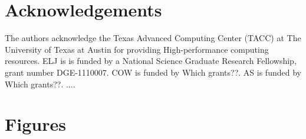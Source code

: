 \documentclass[12pt]{article}
\begin{document}
\section{Acknowledgements}
The authors acknowledge the Texas Advanced Computing Center (TACC) at The University of Texas at Austin for providing High-performance computing resources. ELJ is is funded by a National Science Graduate Research Fellowship, grant number DGE-1110007. COW is funded by {\color{red} Which grants??}.  AS is funded by {\color{red} Which grants??}.
....




\section*{Figures}
%
%
\end{document}
